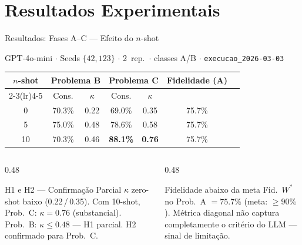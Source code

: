 \documentclass[aspectratio=169, 8pt]{beamer}
\begin{document}
\section{Resultados Experimentais}

\begin{frame}{Resultados: Fases A--C --- Efeito do $n$-shot}
  \begin{block}{GPT-4o-mini $\cdot$ Seeds $\{42,123\}$ $\cdot$ 2~rep.\ $\cdot$
    classes A/B $\cdot$ \texttt{execucao\_2026-03-03}}
  \end{block}

  \vspace{0.4em}

  \begin{center}
  \renewcommand{\arraystretch}{1.35}
  \begin{tabular}{ccccccc}
    \toprule
    \multirow{2}{*}{\textbf{$n$-shot}} &
    \multicolumn{2}{c}{\textbf{Problema B}} &
    \multicolumn{2}{c}{\textbf{Problema C}} &
    \multirow{2}{*}{\textbf{Fidelidade (A)}} \\
    \cmidrule(lr){2-3}\cmidrule(lr){4-5}
    & Cons. & $\kappa$ & Cons. & $\kappa$ & \\
    \midrule
    0  & 70.3\% & 0.22 & 69.0\% & 0.35 & 75.7\% \\
    5  & 75.0\% & 0.48 & 78.6\% & 0.58 & 75.7\% \\
    10 & 70.3\% & 0.46 & \cellcolor{mygreen!25}\textbf{88.1\%}
       & \cellcolor{mygreen!25}\textbf{0.76} & 75.7\% \\
    \bottomrule
  \end{tabular}
  \end{center}

  \vspace{0.2em}

  \begin{columns}[T]
    \begin{column}{0.48\textwidth}
      \begin{exampleblock}{H1 e H2 --- Confirmação Parcial}
        \footnotesize
        $\kappa$ zero-shot baixo (0.22\,/\,0.35). Com 10-shot,
        Prob.~C: $\kappa = 0.76$ (substancial).
        Prob.~B: $\kappa \leq 0.48$ --- H1 parcial.
        H2 confirmado para Prob.~C.
      \end{exampleblock}
    \end{column}
    \begin{column}{0.48\textwidth}
      \begin{alertblock}{Fidelidade abaixo da meta}
        \footnotesize
        Fid.\ $W^*$ no Prob.~A $= 75.7\%$ (meta: $\geq 90\%$).
        Métrica diagonal não captura completamente
        o critério do LLM --- sinal de limitação.
      \end{alertblock}
    \end{column}
  \end{columns}
\end{frame}
\end{document}
